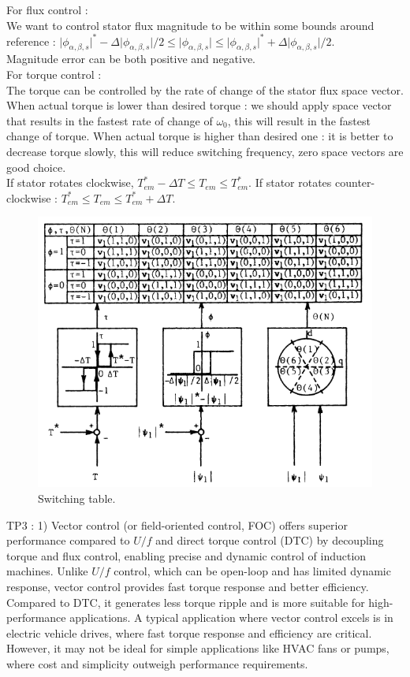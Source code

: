 \documentclass[../main.tex]{subfiles}
\begin{document}
For flux control : \\
We want to control stator flux magnitude to be within some bounds around reference : $\lvert \phi_{\alpha,\beta,s}\rvert^*-\Delta \lvert \phi_{\alpha,\beta,s}\rvert/2 \leq\lvert \phi_{\alpha,\beta,s}\rvert \leq \lvert \phi_{\alpha,\beta,s}\rvert^* + \Delta \lvert \phi_{\alpha,\beta,s}\rvert/2$.\\
Magnitude error can be both positive and negative. \\

For torque control : \\
The torque can be controlled by the rate of change of the stator flux space vector. When actual torque is lower than desired torque : we should apply space vector that results in the fastest rate of change of $\omega_0$, this will result in the fastest change of torque. When actual torque is higher than desired one : it is better to decrease torque slowly, this will reduce switching frequency, zero space vectors are good choice.\\

If stator rotates clockwise, $T_{em}^* -\Delta T \leq T_{em} \leq T_{em}^*$. If stator rotates counter-clockwise : $T_{em}^* \leq T_{em} \leq T_{em}^*+\Delta T$.\\
\begin{figure}
    \centering
    \includegraphics[width=0.5\linewidth]{IMAGES/Indus_el/Screenshot from 2025-04-28 16-54-53.png}
    \caption{Switching table.}
\end{figure}






TP3 : 
1) Vector control (or field-oriented control, FOC) offers superior performance compared to $U/f$ and direct torque control (DTC) by decoupling torque and flux control, enabling precise and dynamic control of induction machines. Unlike $U/f$ control, which can be open-loop and has limited dynamic response, vector control provides fast torque response and better efficiency. Compared to DTC, it generates less torque ripple and is more suitable for high-performance applications. A typical application where vector control excels is in electric vehicle drives, where fast torque response and efficiency are critical. However, it may not be ideal for simple applications like HVAC fans or pumps, where cost and simplicity outweigh performance requirements.
\end{document}
